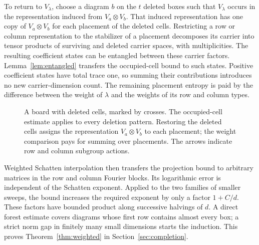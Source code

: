 To return to $V_\lambda$, choose a diagram $b$ on the $t$ deleted boxes
such that $V_\lambda$ occurs in the representation induced from
$V_a\otimes V_b$. That induced representation has one copy of
$V_a\otimes V_b$ for each placement of the deleted cells. Restricting a row or column representation to the stabilizer of a
placement decomposes its carrier into tensor products of surviving and
deleted carrier spaces, with multiplicities. The resulting coefficient states can be entangled between these
carrier factors. Lemma~\ref{lem:entangled} transfers the occupied-cell
bound to such states. Positive coefficient states have total trace one, so summing
their contributions introduces no new carrier-dimension count. The
remaining placement entropy is paid by the difference between the
weight of $\lambda$ and the weights of its row and column types.

\begin{figure}[ht]
\centering
{}
\caption{A board with deleted cells, marked by crosses. The occupied-cell estimate applies to every deletion pattern. Restoring the deleted cells assigns the representation $V_a\otimes V_b$ to each placement; the weight comparison pays for summing over placements. The arrows indicate row and column subgroup actions.}
\label{fig:board}
\end{figure}

Weighted Schatten interpolation then transfers the projection bound
to arbitrary matrices in the row and column Fourier blocks. Its
logarithmic error is independent of the Schatten exponent. Applied to
the two families of smaller sweeps, the bound increases the required
exponent by only a factor $1+C/d$. These factors have bounded product
along successive halvings of $d$. A direct forest estimate covers
diagrams whose first row contains almost every box; a strict norm gap
in finitely many small dimensions starts the induction. This proves
Theorem~\ref{thm:weighted} in Section~\ref{sec:completion}.


